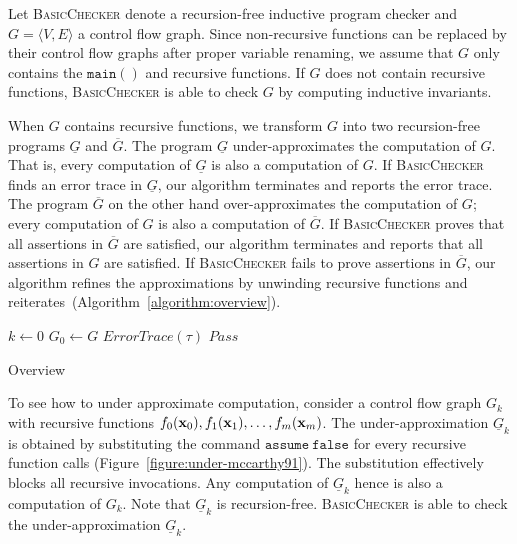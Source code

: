 
Let \textsc{BasicChecker} denote a recursion-free inductive program
checker and $G = \langle V, E \rangle$ a control flow graph. Since
non-recursive functions can be replaced by their control flow graphs
after proper variable renaming, we assume that $G$ only contains the
$\mathtt{main()}$ and recursive functions. If $G$ does not contain
recursive functions, \textsc{BasicChecker} is able to check $G$ by
computing inductive invariants.

When $G$ contains recursive functions, we transform $G$ into two
recursion-free programs $\underline{G}$ and $\overline{G}$. The
program $\underline{G}$ under-approximates the computation of
$G$. That is, every computation of $\underline{G}$ is also a
computation of $G$. If \textsc{BasicChecker} finds an error trace in
$\underline{G}$, our algorithm terminates and reports the error
trace. The program $\overline{G}$ on the other hand over-approximates
the computation of $G$; every computation of $G$ is also a computation
of $\overline{G}$. If \textsc{BasicChecker} proves that all assertions
in $\overline{G}$ are satisfied, our algorithm terminates and reports
that all assertions in $G$ are satisfied. If \textsc{BasicChecker}
fails to prove assertions in $\overline{G}$, our algorithm refines the
approximations by unwinding recursive functions and
reiterates~(Algorithm~\ref{algorithm:overview}). 

\begin{algorithm}
  $k \leftarrow 0$\;
  $G_0 \leftarrow G$\;
  {
    {
      \Return $\mathit{ErrorTrace} (\tau)$\;
    }
    {
      \Return $\mathit{Pass}$\;
    }
  }
  \caption{Overview}
  \label{algorithm:overview}
\end{algorithm}

To see how to under approximate computation, consider a control flow
graph $G_k$ with recursive functions $f_0 (\textbf{x}_0), f_1 (\textbf{x}_1),
\ldots, f_m (\textbf{x}_m)$. The under-approximation $\underline{G}_k$ is
obtained by substituting the command $\mathtt{assume\ false}$ for
every recursive function calls
(Figure~\ref{figure:under-mccarthy91}). The substitution
effectively blocks all recursive invocations. Any computation of
$\underline{G}_k$ hence is also a computation of $G_k$. Note that
$\underline{G}_k$ is recursion-free. \textsc{BasicChecker} is able to
check the under-approximation $\underline{G}_k$.

